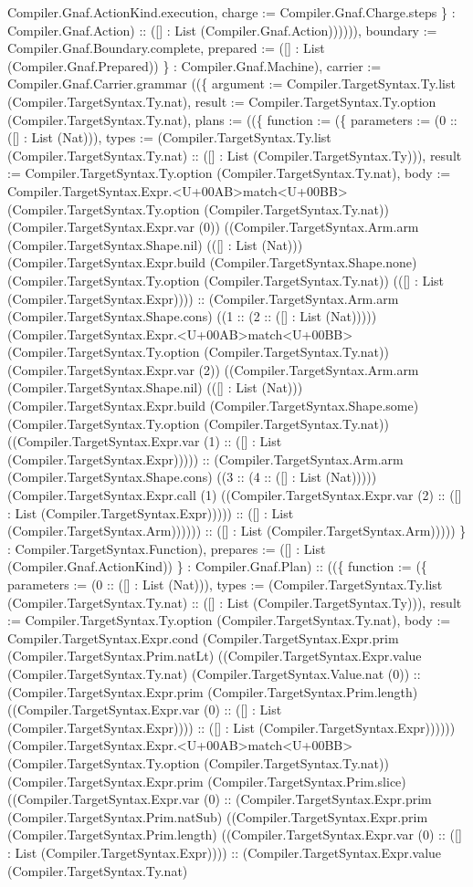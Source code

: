 \documentclass[11pt]{article}
\begin{document}
Compiler.Gnaf.ActionKind.execution, charge := Compiler.Gnaf.Charge.steps \} : Compiler.Gnaf.Action) :: ([] : List (Compiler.Gnaf.Action)))))), boundary := Compiler.Gnaf.Boundary.complete, prepared := ([] : List (Compiler.Gnaf.Prepared)) \} : Compiler.Gnaf.Machine), carrier := Compiler.Gnaf.Carrier.grammar ((\{ argument := Compiler.TargetSyntax.Ty.list (Compiler.TargetSyntax.Ty.nat), result := Compiler.TargetSyntax.Ty.option (Compiler.TargetSyntax.Ty.nat), plans := ((\{ function := (\{ parameters := (0 :: ([] : List (Nat))), types := (Compiler.TargetSyntax.Ty.list (Compiler.TargetSyntax.Ty.nat) :: ([] : List (Compiler.TargetSyntax.Ty))), result := Compiler.TargetSyntax.Ty.option (Compiler.TargetSyntax.Ty.nat), body := Compiler.TargetSyntax.Expr.<U+00AB>match<U+00BB> (Compiler.TargetSyntax.Ty.option (Compiler.TargetSyntax.Ty.nat)) (Compiler.TargetSyntax.Expr.var (0)) ((Compiler.TargetSyntax.Arm.arm (Compiler.TargetSyntax.Shape.nil) (([] : List (Nat))) (Compiler.TargetSyntax.Expr.build (Compiler.TargetSyntax.Shape.none) (Compiler.TargetSyntax.Ty.option (Compiler.TargetSyntax.Ty.nat)) (([] : List (Compiler.TargetSyntax.Expr)))) :: (Compiler.TargetSyntax.Arm.arm (Compiler.TargetSyntax.Shape.cons) ((1 :: (2 :: ([] : List (Nat))))) (Compiler.TargetSyntax.Expr.<U+00AB>match<U+00BB> (Compiler.TargetSyntax.Ty.option (Compiler.TargetSyntax.Ty.nat)) (Compiler.TargetSyntax.Expr.var (2)) ((Compiler.TargetSyntax.Arm.arm (Compiler.TargetSyntax.Shape.nil) (([] : List (Nat))) (Compiler.TargetSyntax.Expr.build (Compiler.TargetSyntax.Shape.some) (Compiler.TargetSyntax.Ty.option (Compiler.TargetSyntax.Ty.nat)) ((Compiler.TargetSyntax.Expr.var (1) :: ([] : List (Compiler.TargetSyntax.Expr))))) :: (Compiler.TargetSyntax.Arm.arm (Compiler.TargetSyntax.Shape.cons) ((3 :: (4 :: ([] : List (Nat))))) (Compiler.TargetSyntax.Expr.call (1) ((Compiler.TargetSyntax.Expr.var (2) :: ([] : List (Compiler.TargetSyntax.Expr))))) :: ([] : List (Compiler.TargetSyntax.Arm)))))) :: ([] : List (Compiler.TargetSyntax.Arm))))) \} : Compiler.TargetSyntax.Function), prepares := ([] : List (Compiler.Gnaf.ActionKind)) \} : Compiler.Gnaf.Plan) :: ((\{ function := (\{ parameters := (0 :: ([] : List (Nat))), types := (Compiler.TargetSyntax.Ty.list (Compiler.TargetSyntax.Ty.nat) :: ([] : List (Compiler.TargetSyntax.Ty))), result := Compiler.TargetSyntax.Ty.option (Compiler.TargetSyntax.Ty.nat), body := Compiler.TargetSyntax.Expr.cond (Compiler.TargetSyntax.Expr.prim (Compiler.TargetSyntax.Prim.natLt) ((Compiler.TargetSyntax.Expr.value (Compiler.TargetSyntax.Ty.nat) (Compiler.TargetSyntax.Value.nat (0)) :: (Compiler.TargetSyntax.Expr.prim (Compiler.TargetSyntax.Prim.length) ((Compiler.TargetSyntax.Expr.var (0) :: ([] : List (Compiler.TargetSyntax.Expr)))) :: ([] : List (Compiler.TargetSyntax.Expr)))))) (Compiler.TargetSyntax.Expr.<U+00AB>match<U+00BB> (Compiler.TargetSyntax.Ty.option (Compiler.TargetSyntax.Ty.nat)) (Compiler.TargetSyntax.Expr.prim (Compiler.TargetSyntax.Prim.slice) ((Compiler.TargetSyntax.Expr.var (0) :: (Compiler.TargetSyntax.Expr.prim (Compiler.TargetSyntax.Prim.natSub) ((Compiler.TargetSyntax.Expr.prim (Compiler.TargetSyntax.Prim.length) ((Compiler.TargetSyntax.Expr.var (0) :: ([] : List (Compiler.TargetSyntax.Expr)))) :: (Compiler.TargetSyntax.Expr.value (Compiler.TargetSyntax.Ty.nat) 
\end{document}
